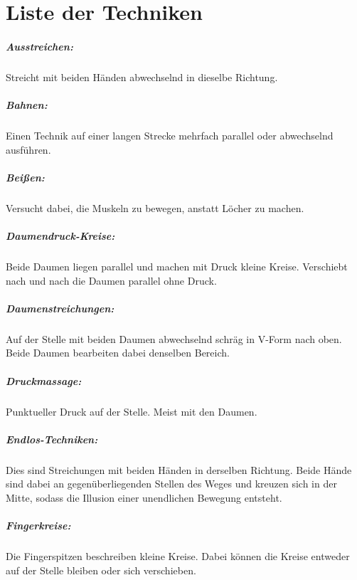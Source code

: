\chapter{Liste der Techniken}

\paragraph{Ausstreichen:} Streicht mit beiden Händen abwechselnd in dieselbe Richtung.

\paragraph{Bahnen:} Einen Technik auf einer langen Strecke mehrfach parallel oder abwechselnd ausführen.

\paragraph{Beißen:} Versucht dabei, die Muskeln zu bewegen, anstatt Löcher zu machen.

\paragraph{Daumendruck-Kreise:} Beide Daumen liegen parallel und machen mit Druck kleine Kreise. Verschiebt nach und nach die Daumen parallel ohne Druck.

\paragraph{Daumenstreichungen:} Auf der Stelle mit beiden Daumen abwechselnd schräg in V-Form nach oben. Beide Daumen bearbeiten dabei denselben Bereich.

\paragraph{Druckmassage:} Punktueller Druck auf der Stelle. Meist mit den Daumen.

\paragraph{Endlos-Techniken:} Dies sind Streichungen mit beiden Händen in derselben Richtung. Beide Hände sind dabei an gegenüberliegenden Stellen des Weges und kreuzen sich in der Mitte, sodass die Illusion einer unendlichen Bewegung entsteht.

\paragraph{Fingerkreise:} Die Fingerspitzen beschreiben kleine Kreise. Dabei können die Kreise entweder auf der Stelle bleiben oder sich verschieben.

